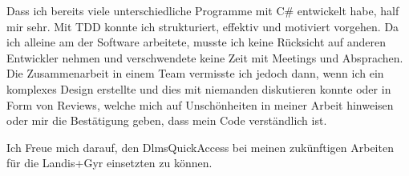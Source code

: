 Dass ich bereits viele unterschiedliche Programme mit C\# entwickelt habe, half mir sehr.
Mit \ac{TDD} konnte ich strukturiert, effektiv und motiviert vorgehen.
Da ich alleine am der Software arbeitete, musste ich keine Rücksicht auf anderen Entwickler nehmen und verschwendete keine Zeit mit Meetings und Absprachen.
Die Zusammenarbeit in einem Team vermisste ich jedoch dann, wenn ich ein komplexes Design erstellte und dies mit niemanden diskutieren konnte oder in Form von Reviews, welche mich auf Unschönheiten in meiner Arbeit hinweisen oder mir die Bestätigung geben, dass mein Code verständlich ist.

Ich Freue mich darauf, den DlmsQuickAccess bei meinen zukünftigen Arbeiten für die Landis+Gyr einsetzten zu können.\dq



% 

